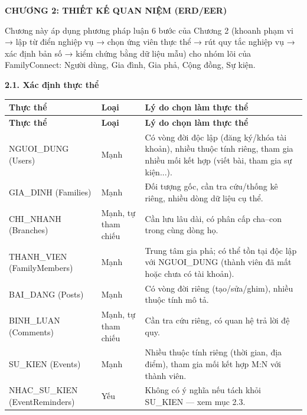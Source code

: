 
\clearpage
{}
{}
{\LARGE\bfseries CHƯƠNG 2: THIẾT KẾ QUAN NIỆM (ERD/EER)}\par\vspace{1em}

Chương này áp dụng phương pháp luận 6 bước của Chương 2 (khoanh phạm vi → lập từ điển nghiệp vụ → chọn ứng viên thực thể → rút quy tắc nghiệp vụ → xác định bản số → kiểm chứng bằng dữ liệu mẫu) cho nhóm lõi của FamilyConnect: Người dùng, Gia đình, Gia phả, Cộng đồng, Sự kiện.

{}
{\Large\bfseries 2.1. Xác định thực thể}\par\vspace{0.7em}

\begin{longtable}{|p{}|p{}|p{}|}
\hline
\textbf{Thực thể} & \textbf{Loại} & \textbf{Lý do chọn làm thực thể } \\ \hline
\endfirsthead
\hline
\textbf{Thực thể} & \textbf{Loại} & \textbf{Lý do chọn làm thực thể } \\ \hline
\endhead
NGUOI\_DUNG (Users) & Mạnh & Có vòng đời độc lập (đăng ký/khóa tài khoản), nhiều thuộc tính riêng, tham gia nhiều mối kết hợp (viết bài, tham gia sự kiện...). \\ \hline
GIA\_DINH (Families) & Mạnh & Đối tượng gốc, cần tra cứu/thống kê riêng, nhiều dòng dữ liệu cụ thể. \\ \hline
CHI\_NHANH (Branches) & Mạnh, tự tham chiếu & Cần lưu lâu dài, có phân cấp cha–con trong cùng dòng họ. \\ \hline
THANH\_VIEN (FamilyMembers) & Mạnh & Trung tâm gia phả; có thể tồn tại độc lập với NGUOI\_DUNG (thành viên đã mất hoặc chưa có tài khoản). \\ \hline
BAI\_DANG (Posts) & Mạnh & Có vòng đời riêng (tạo/sửa/ghim), nhiều thuộc tính mô tả. \\ \hline
BINH\_LUAN (Comments) & Mạnh, tự tham chiếu & Cần tra cứu riêng, có quan hệ trả lời đệ quy. \\ \hline
SU\_KIEN (Events) & Mạnh & Nhiều thuộc tính riêng (thời gian, địa điểm), tham gia mối kết hợp M:N với thành viên. \\ \hline
NHAC\_SU\_KIEN (EventReminders) & Yếu & Không có ý nghĩa nếu tách khỏi SU\_KIEN — xem mục 2.3. \\ \hline
\end{longtable}



